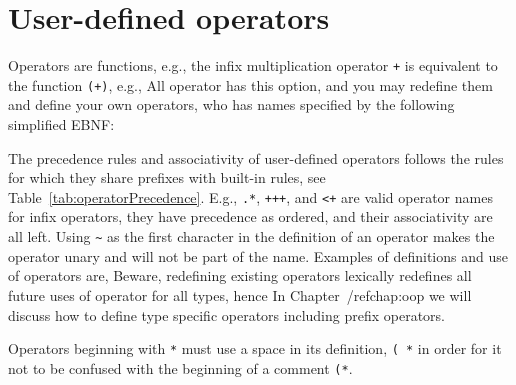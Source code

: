 \section{User-defined operators}
\label{sec:operators}
Operators are functions, e.g., the infix multiplication operator \lstinline!+! is equivalent to the function \lstinline!(+)!, e.g.,
%
%
All operator has this option, and you may redefine them and define your own operators, who has names specified by the following simplified EBNF:
The precedence rules and associativity of user-defined operators follows the rules for which they share prefixes with built-in rules, see Table~\ref{tab:operatorPrecedence}. E.g., \lstinline!.*!, \lstinline!+++!, and \lstinline!<+! are valid operator names for infix operators, they have precedence as ordered, and their associativity are all left. Using \lstinline!~! as the first character in the definition of an operator makes the operator unary and will not be part of the name. Examples of definitions and use of operators are,
%
%
Beware, redefining existing operators lexically redefines all future uses of operator for all types, hence  In Chapter~/ref{chap:oop} we will discuss how to define type specific operators including prefix operators. 

Operators beginning with \lstinline!*! must use a space in its definition, \lstinline!( *! in order for it not to be confused with the beginning of a comment \lstinline!(*!. 

